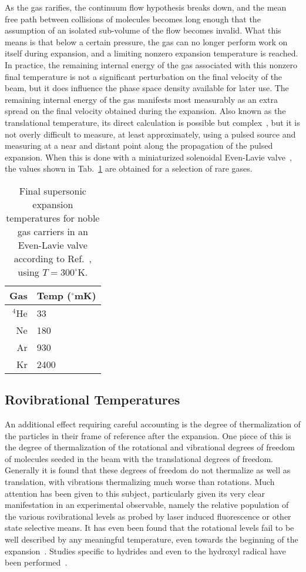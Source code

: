 As the gas rarifies, the continuum flow hypothesis breaks down, and the mean free path between collisions of molecules becomes long enough that the assumption of an isolated sub-volume of the flow becomes invalid.
What this means is that below a certain pressure, the gas can no longer perform work on itself during expansion, and a limiting nonzero expansion temperature is reached.
In practice, the remaining internal energy of the gas associated with this nonzero final temperature is not a significant perturbation on the final velocity of the beam, but it does influence the phase space density available for later use.
The remaining internal energy of the gas manifests most measurably as an extra spread on the final velocity obtained during the expansion.
Also known as the translational temperature, its direct calculation is possible but complex~\cite{Montero2017}, but it is not overly difficult to measure, at least approximately, using a pulsed source and measuring at a near and distant point along the propagation of the pulsed expansion.
When this is done with a miniaturized solenoidal Even-Lavie valve~\cite{Even2014}, the values shown in Tab.~\ref{tabtrans} are obtained for a selection of rare gases.
\begin{table}[t!]
\centering
\caption[Final Supersonic Expansion Temperatures]{Final supersonic expansion temperatures for noble gas carriers in an Even-Lavie valve according to Ref.~\citep[Fig.~12]{Even2014}, using $T=300^\circ$K.\label{tabtrans}}
\begin{tabular}{r|l}
Gas & Temp ($^\circ$mK)\\
\hline
$^4$He & 33 \\
Ne & 180 \\
Ar & 930 \\
Kr & 2400 \\
\end{tabular}
\end{table}

\subsection{Rovibrational Temperatures}

An additional effect requiring careful accounting is the degree of thermalization of the particles in their frame of reference after the expansion.
One piece of this is the degree of thermalization of the rotational and vibrational degrees of freedom of molecules seeded in the beam with the translational degrees of freedom.
Generally it is found that these degrees of freedom do not thermalize as well as translation, with vibrations thermalizing much worse than rotations.
Much attention has been given to this subject, particularly given its very clear manifestation in an experimental observable, namely the relative population of the various rovibrational levels as probed by laser induced fluorescence or other state selective means.
It has even been found that the rotational levels fail to be well described by any meaningful temperature, even towards the beginning of the expansion~\cite{Hulsman2001}.
Studies specific to hydrides and even to the hydroxyl radical have been performed~\cite{Belikov2001}. 

